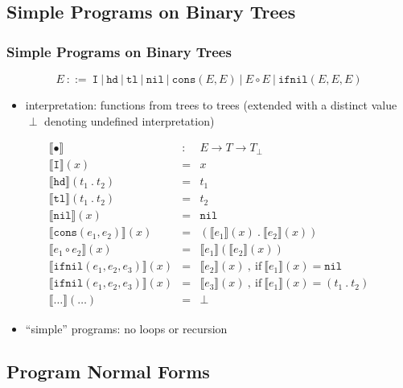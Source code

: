 \documentclass{beamer}
\begin{document}
\subsection{Simple Programs on Binary Trees}

\begin{frame}
  \frametitle{Simple Programs on Binary Trees}
  \[ E ~::=~ \texttt{I} ~|~ \texttt{hd} ~|~ \texttt{tl} ~|~ \texttt{nil}
       ~|~ \texttt{cons}(E, E)
       ~|~ E \circ E
       ~|~ \texttt{ifnil}(E, E, E)  \]
  \begin{itemize}
    \item interpretation: functions from trees to trees 
      (extended with a distinct value $\perp$ denoting undefined interpretation)
  \end{itemize}
  \[
    \begin{array}{lcl}
    \llbracket \bullet \rrbracket & : & E \rightarrow T \rightarrow T_{\perp} \\
    \llbracket \texttt{I} \rrbracket(x) & = & x \\
    \llbracket \texttt{hd} \rrbracket(t_1 ~.~ t_2) & = & t_1 \\
    \llbracket \texttt{tl} \rrbracket(t_1 ~.~ t_2) & = & t_2 \\
    \llbracket \texttt{nil} \rrbracket(x) & = & \texttt{nil} \\
    \llbracket \texttt{cons}(e_1, e_2) \rrbracket(x) & = & 
        (\llbracket e_1 \rrbracket(x) ~.~ \llbracket e_2 \rrbracket(x)) \\
    \llbracket e_1 \circ e_2 \rrbracket(x) & = & 
        \llbracket e_1 \rrbracket(\llbracket e_2 \rrbracket(x)) \\
    \llbracket \texttt{ifnil}(e_1, e_2, e_3) \rrbracket(x) & = & 
        \llbracket e_2 \rrbracket(x) ~,~ \text{if} ~ \llbracket e_1 \rrbracket(x) = \texttt{nil} \\
    \llbracket \texttt{ifnil}(e_1, e_2, e_3) \rrbracket(x) & = & 
        \llbracket e_3 \rrbracket(x) ~,~ \text{if} ~ \llbracket e_1 \rrbracket(x) = (t_1 ~.~ t_2) \\
    \llbracket \ldots \rrbracket(\ldots) & = & \perp
    \end{array}  
  \]
  \begin{itemize}
    \item ``simple'' programs: no loops or recursion
  \end{itemize}
\end{frame}

\subsection{Program Normal Forms}
\end{document}
